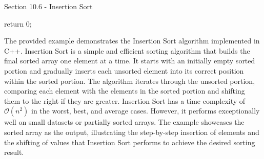 \begin{notes}{Section 10.6 - Insertion Sort}
\begin{highlight}
\begin{code}[C++]
{        return 0;
    }
    \end{code}
        The provided example demonstrates the Insertion Sort algorithm implemented in C++. Insertion Sort is a simple and efficient sorting algorithm that builds the final sorted array one element at a time. It starts with an initially empty sorted portion and gradually inserts each unsorted element into its correct position within the sorted portion. 
        The algorithm iterates through the unsorted portion, comparing each element with the elements in the sorted portion and shifting them to the right if they are greater. Insertion Sort has a time complexity of $\mathcal{O}(n^2)$ in the worst, best, and average cases. However, it performs exceptionally well on small datasets or partially 
        sorted arrays. The example showcases the sorted array as the output, illustrating the step-by-step insertion of elements and the shifting of values that Insertion Sort performs to achieve the desired sorting result.
    \end{highlight}
\end{notes}

